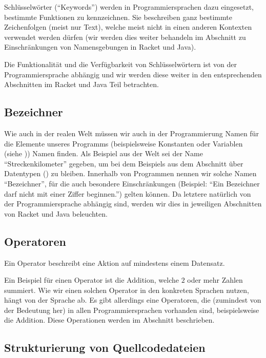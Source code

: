 	Schlüsselwörter (\enquote{Keywords}) werden in Programmiersprachen dazu eingesetzt, bestimmte Funktionen zu kennzeichnen. Sie beschreiben ganz bestimmte Zeichenfolgen (meist nur Text), welche meist nicht in einen anderen Kontexten verwendet werden dürfen (wir werden dies weiter behandeln im Abschnitt zu Einschränkungen von Namensgebungen in Racket und Java).
	
	Die Funktionalität und die Verfügbarkeit von Schlüsselwörtern ist von der Programmiersprache abhängig und wir werden diese weiter in den entsprechenden Abschnitten im Racket und Java Teil betrachten.

\subsection{Bezeichner} \functionalMark \imperativeMark \oopMark
	
	Wie auch in der realen Welt müssen wir auch in der Programmierung Namen für die Elemente unseres Programms (beispielsweise Konstanten oder Variablen (siehe )) Namen finden. Als Beispiel aus der Welt sei der Name \enquote{Streckenkilometer} gegeben, um bei dem Beispiels aus dem Abschnitt über Datentypen () zu bleiben. Innerhalb von Programmen nennen wir solche Namen \enquote{Bezeichner}, für die auch besondere Einschränkungen (Beispiel: \enquote{Ein Bezeichner darf nicht mit einer Ziffer beginnen.}) gelten können. Da letztere natürlich von der Programmiersprache abhängig sind, werden wir dies in jeweiligen Abschnitten von Racket und Java beleuchten.

\subsection{Operatoren} \functionalMark \imperativeMark \oopMark

	Ein Operator beschreibt eine Aktion auf mindestens einem Datensatz.
	
	Ein Beispiel für einen Operator ist die Addition, welche $ 2 $ oder mehr Zahlen summiert. Wie wir einen solchen Operator in den konkreten Sprachen nutzen, hängt von der Sprache ab. Es gibt allerdings eine Operatoren, die (zumindest von der Bedeutung her) in allen Programmiersprachen vorhanden sind, beispielsweise die Addition. Diese Operationen werden im Abschnitt  beschrieben.

\subsection{Strukturierung von Quellcodedateien} \functionalMark \imperativeMark \oopMark
	
